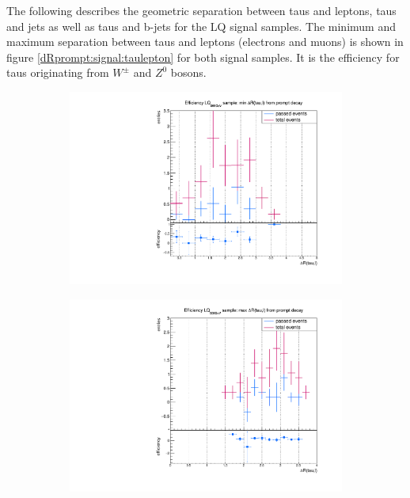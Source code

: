 %
The following describes the geometric separation between taus and leptons, taus and jets as well as taus and b-jets for the LQ signal samples.\newline
The minimum and maximum separation between taus and leptons (electrons and muons) is shown in figure \ref{dRprompt:signal:taulepton} for both signal samples. It is the efficiency for taus originating from $W^\pm$ and $Z^0$ bosons.   
%
\begin{figure}
  \centering
                \begin{subfigure}[t]{0.49\textwidth}
                \includegraphics[width=\textwidth]{figures/plots/LQ75/Divided_pr_mindR_taulepton.pdf}
                \label{dRprompt:signal:taulepton:minLQ75}
                \end{subfigure}
                \begin{subfigure}[t]{0.49\textwidth}
                \includegraphics[width=\textwidth]{figures/plots/LQ75/Divided_maxdR_pr_taulepton.pdf}

\end{subfigure}
\end{figure}
